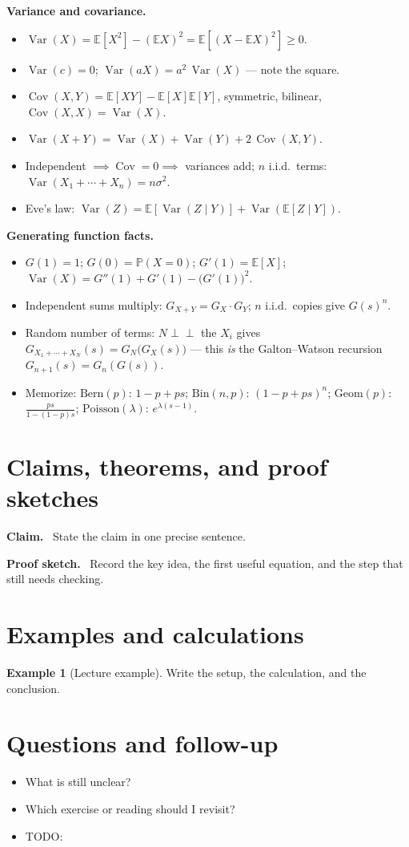 \documentclass[11pt]{article}
\newcommand{\E}{\mathbb{E}}
\newcommand{\Prob}{\mathbb{P}}
\newcommand{\1}{\mathbf{1}}
\newcommand{\given}{\;\big\vert\;}
\newcommand{\indep}{\perp\!\!\!\perp}
\DeclareMathOperator{\Var}{Var}
\DeclareMathOperator{\Cov}{Cov}
\theoremstyle{notestyle}
\theoremstyle{definition}
\newtheorem{example}[theorem]{Example}
\newenvironment{claim}{\par\noindent\textbf{Claim.}\ }{\par}
\newenvironment{proofsketch}{\par\noindent\textbf{Proof sketch.}\ }{\par}
\begin{document}
\par \textbf{Variance and covariance.}
\begin{itemize}
    \item $\Var(X) = \E[X^2] - (\E X)^2 = \E[(X - \E X)^2] \ge 0$.
    \item $\Var(c) = 0$; $\Var(aX) = a^2\,\Var(X)$ --- note the square.
    \item $\Cov(X,Y) = \E[XY] - \E[X]\E[Y]$, symmetric, bilinear,
    $\Cov(X,X) = \Var(X)$.
    \item $\Var(X + Y) = \Var(X) + \Var(Y) + 2\,\Cov(X,Y)$.
    \item Independent $\implies \Cov = 0 \implies$ variances add; $n$ i.i.d.\ terms:
    $\Var(X_1 + \cdots + X_n) = n\sigma^2$.
    \item Eve's law: $\Var(Z) = \E[\Var(Z \given Y)] + \Var(\E[Z \given Y])$.
\end{itemize}
\par \textbf{Generating function facts.}
\begin{itemize}
    \item $G(1) = 1$; $G(0) = \Prob(X = 0)$; $G'(1) = \E[X]$;
    $\Var(X) = G''(1) + G'(1) - \big(G'(1)\big)^2$.
    \item Independent sums multiply: $G_{X+Y} = G_X \cdot G_Y$; $n$ i.i.d.\ copies
    give $G(s)^n$.
    \item Random number of terms: $N \indep$ the $X_i$ gives
    $G_{X_1 + \cdots + X_N}(s) = G_N\big(G_X(s)\big)$ --- this \emph{is} the
    Galton--Watson recursion $G_{n+1}(s) = G_n(G(s))$.
    \item Memorize: $\text{Bern}(p)$: $1 - p + ps$; $\text{Bin}(n,p)$:
    $(1 - p + ps)^n$; $\text{Geom}(p)$: $\frac{ps}{1 - (1-p)s}$;
    $\text{Poisson}(\lambda)$: $e^{\lambda(s-1)}$.
\end{itemize}

\section{Claims, theorems, and proof sketches}
\begin{claim}
State the claim in one precise sentence.
\end{claim}

\begin{proofsketch}
Record the key idea, the first useful equation, and the step that still needs checking.
\end{proofsketch}

\section{Examples and calculations}
\begin{example}[Lecture example]
Write the setup, the calculation, and the conclusion.
\end{example}

\section{Questions and follow-up}
\begin{itemize}
  \item What is still unclear?
  \item Which exercise or reading should I revisit?
  \item TODO:
\end{itemize}
\end{document}
